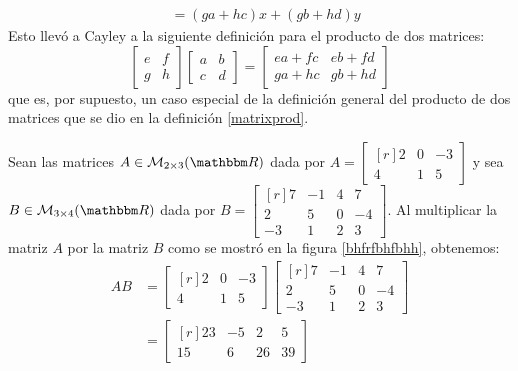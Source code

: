 {{{\begin{align*}
        & =(g a+h c) x+(g b+h d) y
    \end{align*}
    Esto llevó a Cayley a la siguiente definición para el producto de dos matrices:
    $$\!\begin{bmatrix}
        e & \!\! f \\
        g & \!\! h
    \end{bmatrix} \begin{bmatrix}
        a & \!\! b \\
        c & \!\! d
    \end{bmatrix} = \begin{bmatrix}
        e a+f c & \!\! e b+f d \\
        g a+h c & \!\! g b+h d
    \end{bmatrix}$$
    que es, por supuesto, un caso especial de la definición general del producto de dos matrices que se dio en la definición \ref{matrixprod}.
    }}
}
\begin{example}
    Sean las matrices $A \in \mathcal{M}_{2 \times 3}(\RR)$ dada por $A = \begin{bmatrix*}[r]
        2 & 0 & -3 \\
        4 & 1 & 5
    \end{bmatrix*}$ y sea $B \in \mathcal{M}_{3 \times 4}(\RR)$ dada por $B = \begin{bmatrix*}[r]
        7 & -1 & 4 & 7 \\
        2 & 5 & 0 & -4 \\
        -3 & 1 & 2 & 3
    \end{bmatrix*}$. Al multiplicar la matriz $A$ por la matriz $B$ como se mostró en la figura \ref{bhfrfbhfbhh}, obtenemos:
    \begin{align*}
        AB & = \begin{bmatrix*}[r]
        2 & 0 & -3 \\
        4 & 1 & 5
    \end{bmatrix*} \begin{bmatrix*}[r]
        7 & -1 & 4 & 7 \\
        2 & 5 & 0 & -4 \\
        -3 & 1 & 2 & 3
    \end{bmatrix*} \\
    & = \begin{bmatrix*}[r]
        23 & -5 & 2 & 5 \\
        15 & 6 & 26 & 39
    \end{bmatrix*}
    \end{align*}
\end{example}

